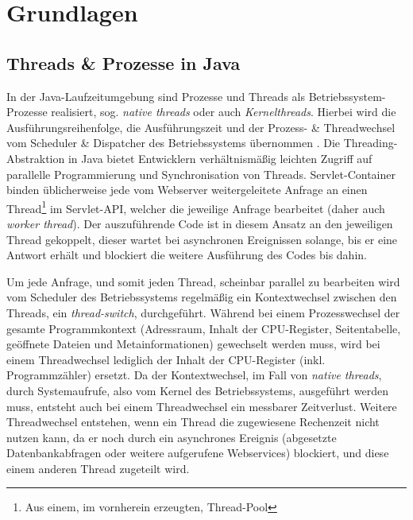 
\section{Grundlagen}
\label{section:grundlagen}

\subsection{Threads \& Prozesse in Java}
\label{sections:treads_prozesse}
In der Java-Laufzeitumgebung sind Prozesse und Threads als Betriebssystem-Prozesse realisiert, sog. \textit{native threads} oder auch \textit{Kernelthreads}.
Hierbei wird die Ausführungsreihenfolge, die Ausführungszeit und der Prozess- \& Threadwechsel
vom Scheduler \& Dispatcher des Betriebssystems übernommen \parencite{Tanenbaum2016}.
Die Threading-Abstraktion in Java bietet Entwicklern verhältnismäßig leichten Zugriff auf parallelle Programmierung und Synchronisation von Threads.\newline
Servlet-Container binden üblicherweise jede vom Webserver weitergeleitete Anfrage an einen
Thread\footnote{Aus einem, im vornherein erzeugten, Thread-Pool} im Servlet-API, welcher die jeweilige Anfrage bearbeitet
(daher auch \textit{worker thread}).\newline
Der auszuführende Code ist in diesem Ansatz an den jeweiligen Thread gekoppelt, dieser wartet bei
asynchronen Ereignissen solange, bis er eine Antwort erhält und blockiert die weitere Ausführung des Codes bis dahin.

Um jede Anfrage, und somit jeden Thread, scheinbar parallel zu bearbeiten wird vom Scheduler
des Betriebssystems regelmäßig ein Kontextwechsel zwischen den Threads,
ein \textit{thread-switch}, durchgeführt. Während bei einem Prozesswechsel der gesamte Programmkontext (Adressraum, Inhalt der CPU-Register,
Seitentabelle, geöffnete Dateien und Metainformationen)
gewechselt werden muss, wird bei einem Threadwechsel lediglich der Inhalt der CPU-Register (inkl. Programmzähler) ersetzt\parencite{Brosenne2021}.
Da der Kontextwechsel, im Fall von \textit{native threads}, durch Systemaufrufe, also vom Kernel des Betriebssystems, ausgeführt werden muss, entsteht auch
bei einem Threadwechsel ein messbarer Zeitverlust.\newline
Weitere Threadwechsel entstehen, wenn ein Thread die zugewiesene Rechenzeit nicht nutzen kann, da er noch durch ein asynchrones Ereignis
(abgesetzte Datenbankabfragen oder weitere aufgerufene Webservices) blockiert, und diese einem anderen Thread zugeteilt wird.

